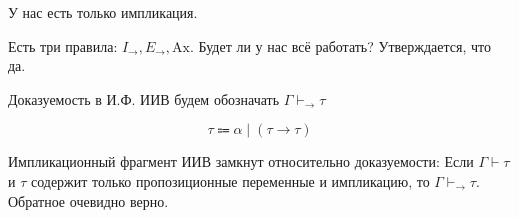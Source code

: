 У нас есть только импликация. %

Есть три правила: \(I_{\to}, E_{\to}, \mathrm{Ax}\). Будет ли у нас всё работать? Утверждается, что да.

\begin{notation}
    Доказуемость в И.Ф. ИИВ будем обозначать \(\Gamma \vdash_{\to} \tau\)
\end{notation}

\begin{definition}
    \[\tau \Coloneqq \alpha \mid (\tau \to \tau)\]
\end{definition}

\begin{theorem}
    Импликационный фрагмент ИИВ замкнут относительно доказуемости:
    Если \(\Gamma \vdash \tau\) и \(\tau\) содержит только пропозиционные переменные и импликацию, то \(\Gamma \vdash_{\to} \tau\). Обратное очевидно верно.
\end{theorem}
